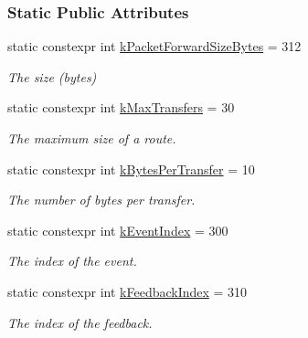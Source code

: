 \subsubsection*{Static Public Attributes}
\begin{DoxyCompactItemize}
\item 
\mbox{\label{classosse_1_1collaborate_1_1_packet_forward_a47107f0bbd0e8648650abeebb46fefc9}} 
static constexpr int \hyperlink{classosse_1_1collaborate_1_1_packet_forward_a47107f0bbd0e8648650abeebb46fefc9}{k\+Packet\+Forward\+Size\+Bytes} = 312
\begin{DoxyCompactList}\small\item\em The size (bytes) \end{DoxyCompactList}\item 
\mbox{\label{classosse_1_1collaborate_1_1_packet_forward_ae6a49cb87c138068b0e4f9c68a4a202f}} 
static constexpr int \hyperlink{classosse_1_1collaborate_1_1_packet_forward_ae6a49cb87c138068b0e4f9c68a4a202f}{k\+Max\+Transfers} = 30
\begin{DoxyCompactList}\small\item\em The maximum size of a route. \end{DoxyCompactList}\item 
\mbox{\label{classosse_1_1collaborate_1_1_packet_forward_a31d3aee3aa9c241a30910ccc365b8316}} 
static constexpr int \hyperlink{classosse_1_1collaborate_1_1_packet_forward_a31d3aee3aa9c241a30910ccc365b8316}{k\+Bytes\+Per\+Transfer} = 10
\begin{DoxyCompactList}\small\item\em The number of bytes per transfer. \end{DoxyCompactList}\item 
\mbox{\label{classosse_1_1collaborate_1_1_packet_forward_a5ae3c5868c471ffc222a30a647092f3c}} 
static constexpr int \hyperlink{classosse_1_1collaborate_1_1_packet_forward_a5ae3c5868c471ffc222a30a647092f3c}{k\+Event\+Index} = 300
\begin{DoxyCompactList}\small\item\em The index of the event. \end{DoxyCompactList}\item 
\mbox{\label{classosse_1_1collaborate_1_1_packet_forward_a539708e3f37b9de4dcb8245d348a9087}} 
static constexpr int \hyperlink{classosse_1_1collaborate_1_1_packet_forward_a539708e3f37b9de4dcb8245d348a9087}{k\+Feedback\+Index} = 310
\begin{DoxyCompactList}\small\item\em The index of the feedback. \end{DoxyCompactList}\end{DoxyCompactItemize}
